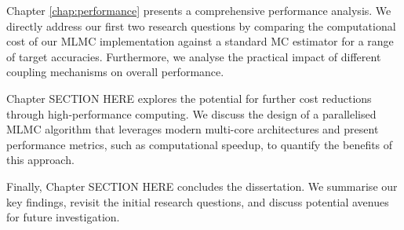 Chapter \ref{chap:performance} presents a comprehensive performance analysis. 
We directly address our first two research questions by comparing the 
computational cost of our MLMC implementation against a standard MC 
estimator for a range of target accuracies. Furthermore, we analyse 
the practical impact of different coupling mechanisms on overall performance.

Chapter SECTION HERE explores the potential for further cost reductions 
through high-performance computing. We discuss the design of a parallelised MLMC 
algorithm that leverages modern multi-core architectures and present performance 
metrics, such as computational speedup, to quantify the benefits of this approach.

Finally, Chapter SECTION HERE concludes the dissertation. 
We summarise our key findings, 
revisit the initial research questions, and discuss potential avenues for 
future investigation.



 
